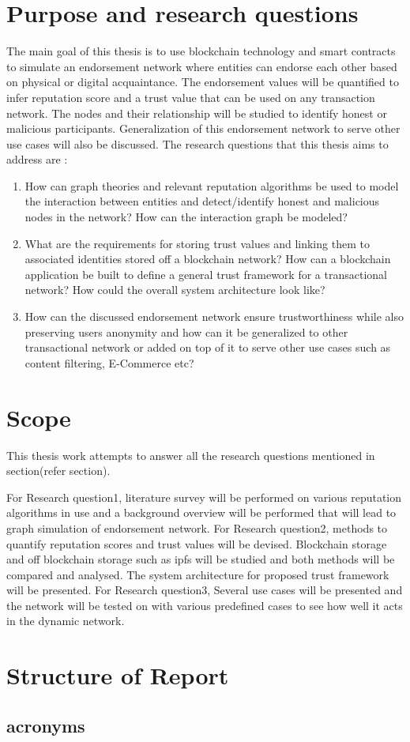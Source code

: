 \section{Purpose and research questions}
The main goal of this thesis is to use blockchain technology and 
smart contracts to simulate an endorsement network where entities can 
endorse each other based on physical or digital acquaintance. The 
endorsement values will be quantified to infer reputation score and 
a trust value that can be used on any transaction network. The nodes and 
their relationship will be studied to identify honest or malicious 
participants. Generalization of this endorsement network to serve 
other use cases will also be discussed. 
The research questions that this thesis aims to address are : 
\begin{enumerate}
\item How can graph theories and relevant reputation algorithms be used 
to model the interaction between entities and detect/identify honest 
and malicious nodes in the network? How can the interaction graph be
modeled?
\item What are the requirements for storing trust values and linking 
them to associated identities stored off a blockchain network? How can a blockchain application be built to define a general trust framework for 
a transactional network? How could the overall system architecture look like? 
\item How can the discussed endorsement network ensure trustworthiness
while also preserving users anonymity and how can it be generalized to
other transactional network or added on top of it to serve other use 
cases such as content filtering, E-Commerce etc? 
\end{enumerate}


\section{Scope} 
This thesis work attempts to answer all the research questions mentioned
in section(refer section).
 
For Research question1, literature survey will be performed on various 
reputation algorithms in use and a background overview will be 
performed that will lead to graph simulation of endorsement network.  
For Research question2, methods to quantify reputation scores and trust 
values will be devised. Blockchain storage and off blockchain storage 
such as ipfs will be studied and both methods will be compared and 
analysed. The system architecture for proposed trust framework will be 
presented. For Research question3, Several use cases will be presented 
and the network will be tested on with various predefined cases to see 
how well it acts in the dynamic network. 

\section{Structure of Report}
\subsection{acronyms}


